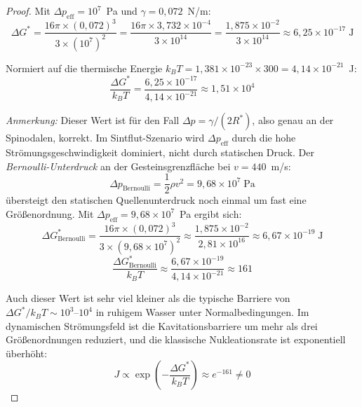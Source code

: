 ﻿\documentclass[12pt,a4paper]{report}
\begin{document}
\begin{proof}
	Mit $\Delta p_\mathrm{eff} = 10^7$~Pa und $\gamma = 0{,}072$~N/m:
	\begin{equation}
		\Delta G^* = \frac{16\pi\times(0{,}072)^3}{3\times(10^7)^2} = \frac{16\pi\times3{,}732\times10^{-4}}{3\times10^{14}} = \frac{1{,}875\times10^{-2}}{3\times10^{14}} \approx 6{,}25\times10^{-17}\;\text{J}
		\label{eq:delta_G_numerisch}
	\end{equation}
	
	Normiert auf die thermische Energie $k_BT = 1{,}381\times10^{-23}\times300 = 4{,}14\times10^{-21}$~J:
	\begin{equation}
		\frac{\Delta G^*}{k_BT} = \frac{6{,}25\times10^{-17}}{4{,}14\times10^{-21}} \approx 1{,}51\times10^{4}
		\label{eq:barrierebreite_therm}
	\end{equation}
	
	\textit{Anmerkung:} Dieser Wert ist für den Fall $\Delta p = \gamma/(2R^*)$, also genau an der Spinodalen, korrekt. Im Sintflut-Szenario wird $\Delta p_\mathrm{eff}$ durch die hohe Strömungsgeschwindigkeit dominiert, nicht durch statischen Druck. Der \textit{Bernoulli-Unterdruck} an der Gesteinsgrenzfläche bei $v = 440$~m/s:
	\begin{equation}
		\Delta p_\mathrm{Bernoulli} = \frac{1}{2}\rho v^2 = 9{,}68\times10^7\;\text{Pa}
		\label{eq:bernoulli_unterdruck}
	\end{equation}
	übersteigt den statischen Quellenunterdruck noch einmal um fast eine Größenordnung. Mit $\Delta p_\mathrm{eff} = 9{,}68\times10^7$~Pa ergibt sich:
	\begin{equation}
		\Delta G^*_\mathrm{Bernoulli} = \frac{16\pi\times(0{,}072)^3}{3\times(9{,}68\times10^7)^2} \approx \frac{1{,}875\times10^{-2}}{2{,}81\times10^{16}} \approx 6{,}67\times10^{-19}\;\text{J}
		\label{eq:delta_G_bernoulli}
	\end{equation}
	\begin{equation}
		\frac{\Delta G^*_\mathrm{Bernoulli}}{k_BT} \approx \frac{6{,}67\times10^{-19}}{4{,}14\times10^{-21}} \approx 161
		\label{eq:barrierebreite_bernoulli}
	\end{equation}
	
	Auch dieser Wert ist sehr viel kleiner als die typische Barriere von $\Delta G^*/k_BT \sim 10^3$--$10^4$ in ruhigem Wasser unter Normalbedingungen. Im dynamischen Strömungsfeld ist die Kavitationsbarriere um mehr als drei Größenordnungen reduziert, und die klassische Nukleationsrate ist exponentiell überhöht:
	\begin{equation}
		J \propto \exp\!\left(-\frac{\Delta G^*}{k_BT}\right) \approx e^{-161} \neq 0
		\label{eq:nukleationsrate}
	\end{equation}
	

\end{proof}
\end{document}
